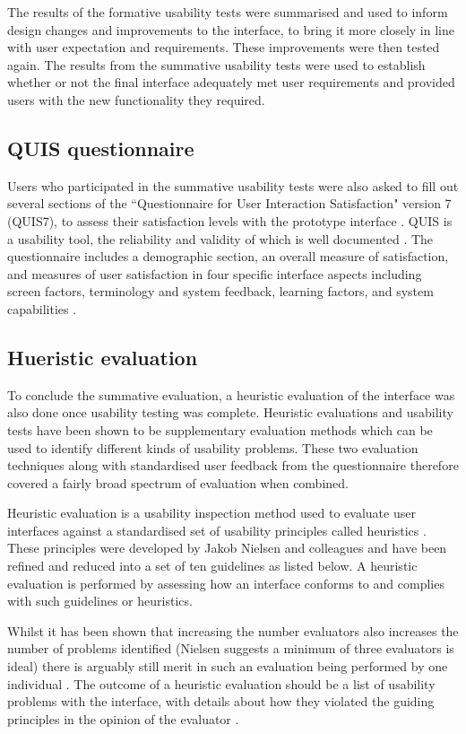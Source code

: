 The results of the formative usability tests were summarised and used to inform design changes and improvements to the interface, to bring it more closely in line with user expectation and requirements. These improvements were then tested again. The results from the summative usability tests were used to establish whether or not the final interface adequately met user requirements and provided users with the new functionality they required.

\subsection{QUIS questionnaire}
Users who participated in the summative usability tests were also asked to fill out several sections of the ``Questionnaire for User Interaction Satisfaction" version 7 (QUIS7), to assess their satisfaction levels with the prototype interface \citep{QUIS}. QUIS is a usability tool, the reliability and validity of which is well documented \citep{Harper1997}. The questionnaire includes a demographic section, an overall measure of satisfaction, and measures of user satisfaction in four specific interface aspects including screen factors, terminology and system feedback, learning factors, and system capabilities \citep{Harper1993}.  

\subsection{Hueristic evaluation}
To conclude the summative evaluation, a heuristic evaluation of the interface was also done once usability testing was complete. Heuristic evaluations and usability tests have been shown to be supplementary evaluation methods which can be used to identify different kinds of usability problems\citep{Nielsen1995}. These two evaluation techniques along with standardised user feedback from the questionnaire therefore covered a fairly broad spectrum of evaluation when combined. 

Heuristic evaluation is a usability inspection method used to evaluate user interfaces against a standardised set of usability principles called heuristics \citep[p. 506]{RogersPreece}. These principles were developed by Jakob Nielsen and colleagues \citep{NielsenMolich} and have been refined and reduced into a set of ten guidelines as listed below. A heuristic evaluation is performed by assessing how an interface conforms to and complies with such guidelines or heuristics. 

Whilst it has been shown that increasing the number evaluators also increases the number of problems identified (Nielsen suggests a minimum of three evaluators is ideal) there is arguably still merit in such an evaluation being performed by one individual \citep{NielsenHow}. The outcome of a heuristic evaluation should be a list of usability problems with the interface, with details about how they violated the guiding principles in the opinion of the evaluator \citep{NielsenHow}. 

